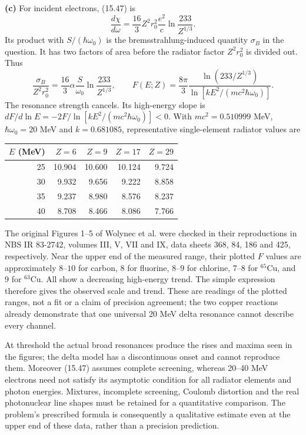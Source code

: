 \medskip\noindent\textbf{(c)} For incident electrons,
(15.47) is
\[
\frac{d\chi}{d\omega}=\frac{16}3Z^2r_0^2\frac{e^2}{c}
 \ln\frac{233}{Z^{1/3}}.
\]
Its product with $S/(\hbar\omega_0)$ is the bremsstrahlung-induced
quantity $\sigma_B$ in the question.  It has two factors of area
before the radiator factor $Z^2r_0^2$ is divided out.  Thus
\[
\frac{\sigma_B}{Z^2r_0^2}=\frac{16}3\alpha\frac S{\omega_0}
 \ln\frac{233}{Z^{1/3}},\qquad
\boxed{F(E;Z)=\frac{8\pi}{3}
\frac{\ln(233/Z^{1/3})}
 {\ln[kE^2/(mc^2\hbar\omega_0)]}.}
\]
The resonance strength cancels.  Its high-energy slope is
$dF/d\ln E=-2F/\ln[kE^2/(mc^2\hbar\omega_0)]<0$.
With $mc^2=0.510999$ MeV, $\hbar\omega_0=20$ MeV and
$k=0.681085$, representative single-element radiator values are
\begin{center}
\begin{tabular}{rrrrr}
\toprule
$E$ (MeV)&$Z=6$&$Z=9$&$Z=17$&$Z=29$\\
\midrule
25&10.904&10.600&10.124&9.724\\
30&9.932&9.656&9.222&8.858\\
35&9.237&8.980&8.576&8.237\\
40&8.708&8.466&8.086&7.766\\
\bottomrule
\end{tabular}
\end{center}
The original Figures 1--5 of Wolynec et al. were checked in their
reproductions in NBS IR 83-2742, volumes III, V, VII and IX,
data sheets 368, 84, 186 and 425, respectively.  Near the upper
end of the measured range, their plotted $F$ values are approximately
$8$--$10$ for carbon, $8$ for fluorine, $8$--$9$ for chlorine,
$7$--$8$ for $^{65}$Cu, and $9$ for $^{63}$Cu.  All show a decreasing
high-energy trend.  The simple expression therefore gives the
observed scale and trend.  These are readings of the plotted ranges,
not a fit or a claim of precision agreement; the two copper reactions
already demonstrate that one universal 20 MeV delta resonance
cannot describe every channel.

At threshold the actual broad resonances produce the rises and maxima
seen in the figures; the delta model has a discontinuous onset and
cannot reproduce them.  Moreover (15.47) assumes complete screening,
whereas 20--40 MeV electrons need not satisfy its asymptotic condition
for all radiator elements and photon energies.  Mixtures, incomplete
screening, Coulomb distortion and the real photonuclear line shapes
must be retained for a quantitative comparison.  The problem's
prescribed formula is consequently a qualitative estimate even at
the upper end of these data, rather than a precision prediction.


